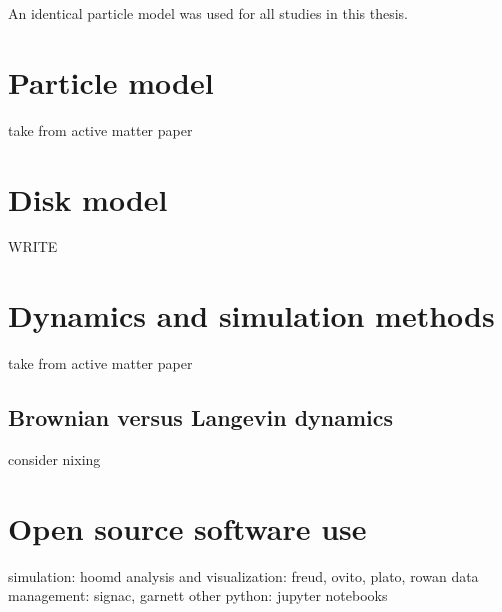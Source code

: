 An identical particle model was used for all studies in this thesis.

\section{Particle model}
take from active matter paper

\section{Disk model}
WRITE

\section{Dynamics and simulation methods}
take from active matter paper

\subsection{Brownian versus Langevin dynamics}
consider nixing

\section{Open source software use}
simulation: hoomd
analysis and visualization: freud, ovito, plato, rowan
data management: signac, garnett
other python: jupyter notebooks

